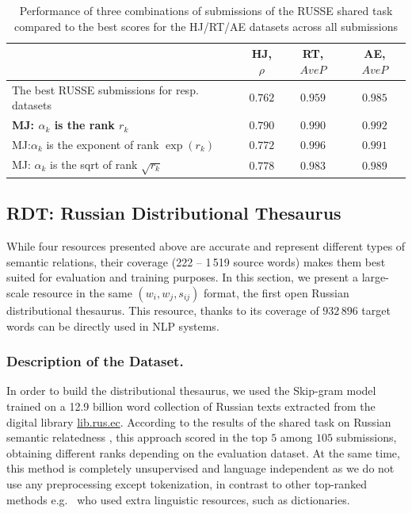 \documentclass[runningheads,a4paper]{llncs}
\begin{document}
\begin{table}[ht]
\centering
\caption{Performance of three combinations of submissions of the RUSSE shared task compared to the best scores for the HJ/RT/AE datasets across all submissions}
\label{tab:ranks}
\begin{tabular}{l|ccc}\toprule
                          & \textbf{HJ, $\rho$} & \textbf{RT, $AveP$} & \textbf{AE, $AveP$} \\ \midrule
The best RUSSE submissions for resp. datasets & $0.762$             & $0.959$             & $0.985$             \\
\bf MJ: $\alpha_k$ is the rank $r_k$                  & $\mathbf{0.790}$    & $0.990$             & $\mathbf{0.992}$    \\
MJ:$\alpha_k$ is the exponent of rank $\exp(r_k)$      & $0.772$             & $\mathbf{0.996}$    & $0.991$             \\
MJ: $\alpha_k$ is the sqrt of rank $\sqrt{r_k}$          & $0.778$             & $0.983$             & $0.989$ \\ \bottomrule
\end{tabular}
\end{table}

\subsection{RDT: Russian Distributional Thesaurus}\label{sub:rdt}

While four resources presented above are accurate and represent different types of semantic relations, their coverage (222 -- 1\,519 source words) makes them best suited for evaluation and training purposes. In this section, we present a large-scale resource in the same $(w_i, w_j, s_{ij})$ format, the first open Russian distributional thesaurus. This resource, thanks to its coverage of $932\,896$ target words can be directly used in NLP systems.

\subsubsection{Description of the Dataset.}

In order to build the distributional thesaurus, we used the Skip-gram model \cite{Mikolov:13} trained on a 12.9 billion word collection of Russian texts extracted from the digital library \url{lib.rus.ec}. According to the results of the shared task on Russian semantic relatedness \cite{Panchenko:15,Arefyev:15}, this approach scored in the top $5$ among $105$ submissions, obtaining different ranks depending on the evaluation dataset. At the same time, this method is completely unsupervised and language independent as we do not use any preprocessing except tokenization, in contrast to other top-ranked methods e.g.~\cite{Lopukhin:15} who used extra linguistic resources, such as dictionaries.
\end{document}
